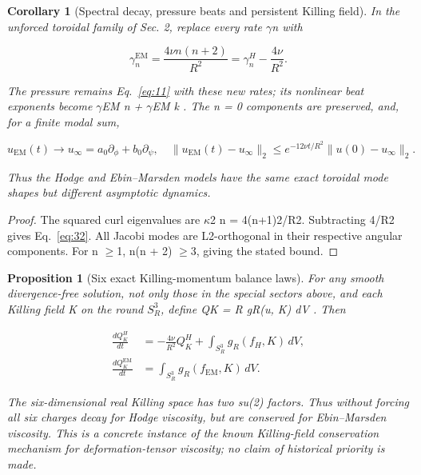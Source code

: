 \documentclass[10pt,letterpaper]{article}
\newtheorem{corollary}[theorem]{Corollary}
\newtheorem{proposition}[theorem]{Proposition}
\theoremstyle{remark}
\begin{document}
\begin{corollary}[Spectral decay, pressure beats and persistent Killing field]

In the unforced toroidal family of Sec. 2, replace every rate \(\gamma \)n with


\begin{equation}
\tag{32}\label{eq:32}
\gamma_n^{\mathrm{EM}}=\frac{4\nu n(n+2)}{R^2}=\gamma_n^H-\frac{4\nu}{R^2}.
\end{equation}

The pressure remains Eq.~\eqref{eq:11} with these new rates; its nonlinear beat exponents become \(\gamma \)EM n + \(\gamma \)EM k . The n = 0 components are preserved, and, for a finite modal sum,



\begin{equation}
\tag{33}\label{eq:33}
u_{\mathrm{EM}}(t)\longrightarrow u_\infty=a_0\partial_\phi+b_0\partial_\psi,\quad\|u_{\mathrm{EM}}(t)-u_\infty\|_2\le e^{-12\nu t/R^2}\|u(0)-u_\infty\|_2.
\end{equation}

Thus the Hodge and Ebin–Marsden models have the same exact toroidal mode shapes but different asymptotic dynamics.


\end{corollary}

\begin{proof}
The squared curl eigenvalues are \(\kappa \)2 n = 4(n+1)2/R2. Subtracting 4/R2 gives Eq.~\eqref{eq:32}. All Jacobi modes are L2-orthogonal in their respective angular components. For n \(\ge \)1, n(n + 2) \(\ge \)3, giving the stated bound.

\end{proof}

\begin{proposition}[Six exact Killing-momentum balance laws]

For any smooth divergence-free solution, not only those in the special sectors above, and each Killing field K on the round \(S_R^3\), define QK = R gR(u, K) dV . Then


\begin{equation}
\tag{34}\label{eq:34}
\begin{aligned}\frac{dQ_K^H}{dt}&=-\frac{4\nu}{R^2}Q_K^H+\int_{S_R^3}g_R(f_H,K)\,dV,\\ \frac{dQ_K^{\mathrm{EM}}}{dt}&=\int_{S_R^3}g_R(f_{\mathrm{EM}},K)\,dV.\end{aligned}
\end{equation}

The six-dimensional real Killing space has two su(2) factors. Thus without forcing all six charges decay for Hodge viscosity, but are conserved for Ebin–Marsden viscosity. This is a concrete instance of the known Killing-field conservation mechanism for deformation-tensor viscosity; no claim of historical priority is made.


\end{proposition}
\end{document}
